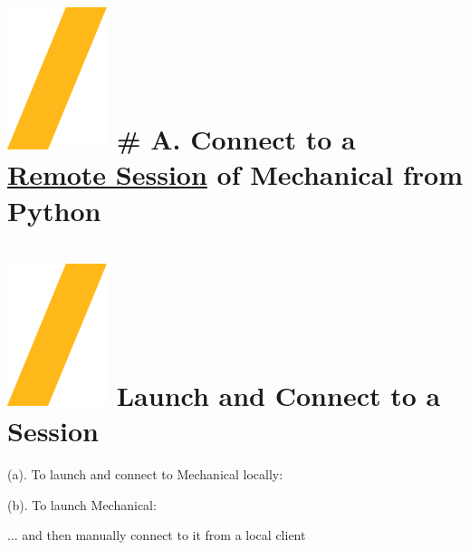 \documentclass[9pt,landscape]{article}
\begin{document}
\begin{multicols}{3}
\setlength{\premulticols}{1pt}
\setlength{\postmulticols}{1pt}
\setlength{\multicolsep}{1pt}
\setlength{\columnsep}{2pt}

\vfill
\section{\includegraphics[height=\fontcharht\font`\S]{slash.png} # A. Connect to a \underline{Remote Session} of Mechanical from Python}


\section{\includegraphics[height=\fontcharht\font`\S]{slash.png} Launch and Connect to a Session}

(a). To launch and connect to Mechanical locally:


(b). To launch Mechanical:


... and then  manually connect to it from a local client





\end{multicols}
\end{document}
